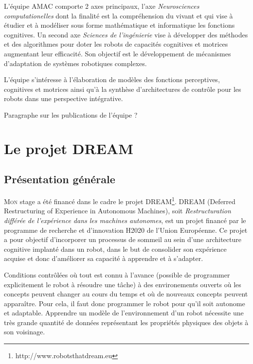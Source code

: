 \documentclass[draft]{llncs}
\begin{document}
L'équipe AMAC comporte 2 axes principaux, l'axe \textit{Neurosciences computationelles} dont la finalité est la compréhension du vivant et qui vise à étudier et à modéliser sous forme mathématique et informatique les fonctions cognitives.
Un second axe \textit{Sciences de l'ingénierie} vise à développer des méthodes et des algorithmes pour doter les robots de capacités cognitives et motrices augmentant leur efficacité. Son objectif est le développement de mécanismes d'adaptation de systèmes robotiques complexes.
 
L’équipe s’intéresse à l’élaboration de modèles des fonctions perceptives, cognitives et motrices ainsi qu’à la synthèse d’architectures de contrôle pour les robots dans une perspective intégrative.


Paragraphe sur les publications de l'équipe ?



\section{Le projet DREAM}

\subsection{Présentation générale}

\lettrine{M}{on} stage a été financé dans le cadre le projet DREAM\footnote{http://www.robotsthatdream.eu}.
DREAM (Deferred Restructuring of Experience in Autonomous Machines), soit \textit{Restructuration différée de l'expérience dans les machines autonomes}, est un projet financé par le programme de recherche et d'innovation H2020 de l'Union Européenne.
Ce projet a pour objectif d'incorporer un processus de sommeil au sein d'une architecture cognitive implanté dans un robot, dans le but de consolider son expérience acquise et donc d'améliorer sa capacité à apprendre et à s'adapter.

Conditions contrôlées où tout est connu à l'avance (possible de programmer explicitement le robot à résoudre une tâche) à des environements ouverts où les concepts peuvent changer au cours du temps et où de nouveaux concepts peuvent apparaître.
Pour cela, il faut donc programmer le robot pour qu'il soit autonome et adaptable.
Apprendre un modèle de l'environnement d'un robot nécessite une très grande quantité de données représentant les propriétés physiques des objets à son voisinage.
\end{document}
